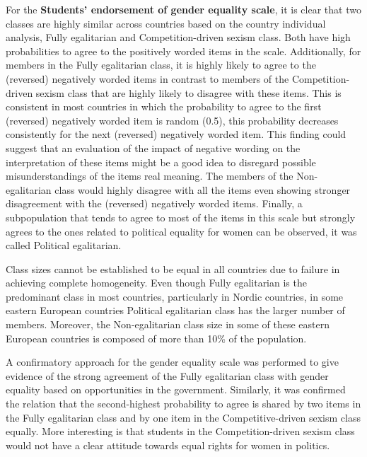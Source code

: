 \documentclass[12pt,a4paper,oneside]{reedthesis}
\begin{document}
For the \textbf{Students' endorsement of gender equality scale}, it is clear that two classes are highly similar across countries based on the country individual analysis, Fully egalitarian and Competition-driven sexism class. Both have high probabilities to agree to the positively worded items in the scale. Additionally, for members in the Fully egalitarian class, it is highly likely to agree to the (reversed) negatively worded items in contrast to members of the Competition-driven sexism class that are highly likely to disagree with these items. This is consistent in most countries in which the probability to agree to the first (reversed) negatively worded item is random (0.5), this probability decreases consistently for the next (reversed) negatively worded item. This finding could suggest that an evaluation of the impact of negative wording on the interpretation of these items might be a good idea to disregard possible misunderstandings of the items real meaning. The members of the Non-egalitarian class would highly disagree with all the items even showing stronger disagreement with the (reversed) negatively worded items. Finally, a subpopulation that tends to agree to most of the items in this scale but strongly agrees to the ones related to political equality for women can be observed, it was called Political egalitarian.

Class sizes cannot be established to be equal in all countries due to failure in achieving complete homogeneity. Even though Fully egalitarian is the predominant class in most countries, particularly in Nordic countries, in some eastern European countries Political egalitarian class has the larger number of members. Moreover, the Non-egalitarian class size in some of these eastern European countries is composed of more than 10\% of the population.

A confirmatory approach for the gender equality scale was performed to give evidence of the strong agreement of the Fully egalitarian class with gender equality based on opportunities in the government. Similarly, it was confirmed the relation that the second-highest probability to agree is shared by two items in the Fully egalitarian class and by one item in the Competitive-driven sexism class equally. More interesting is that students in the Competition-driven sexism class would not have a clear attitude towards equal rights for women in politics.
\end{document}
